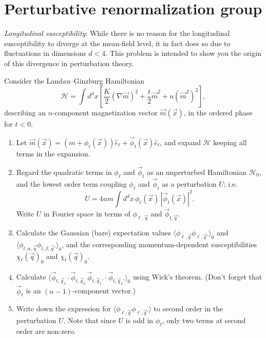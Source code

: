 \chapter{Perturbative renormalization group}

\begin{problem}
    \textit{Longitudinal susceptibility}: While there is no reason for the longitudinal susceptibility to diverge at the mean-field level, it in fact does so due to fluctuations in dimensions $d < 4$. This problem is intended to show you the origin of this divergence in perturbation theory.

    Consider the Landau--Ginzburg Hamiltonian
    \[
        \mathcal{H} = \int d^dx\left[\frac{K}{2}(\nabla\vec{m})^2 + \frac{t}{2}\vec{m}^2 + u(\vec{m}^2)^2\right],
    \]
    describing an $n$-component magnetization vector $\vec{m}(\vec{x})$, in the ordered phase for $t < 0$.

    \begin{enumerate}
        \item[(a)] Let $\vec{m}(\vec{x}) = (m + \phi_\ell(\vec{x}))\hat{e}_\ell + \vec{\phi}_t(\vec{x})\hat{e}_t$, and expand $\mathcal{H}$ keeping all terms in the expansion.

        \item[(b)] Regard the quadratic terms in $\phi_\ell$ and $\vec{\phi}_t$ as an unperturbed Hamiltonian $\mathcal{H}_0$, and the lowest order term coupling $\phi_\ell$ and $\vec{\phi}_t$ as a perturbation $U$; i.e.
        \[
            U = 4um\int d^dx\,\phi_\ell(\vec{x})\,|\vec{\phi}_t(\vec{x})|^2.
        \]
        Write $U$ in Fourier space in terms of $\phi_{\ell,\vec{q}}$ and $\vec{\phi}_{t,\vec{q}}$.

        \item[(c)] Calculate the Gaussian (bare) expectation values $\langle\phi_{\ell,\vec{q}}\phi_{\ell,\vec{q}'}\rangle_0$ and $\langle\phi_{t,\alpha,\vec{q}}\phi_{t,\beta,\vec{q}'}\rangle_0$, and the corresponding momentum-dependent susceptibilities $\chi_\ell(\vec{q})_0$ and $\chi_t(\vec{q})_0$.

        \item[(d)] Calculate $\langle\vec{\phi}_{t,\vec{q}_1}\cdot\vec{\phi}_{t,\vec{q}_2}\,\vec{\phi}_{t,\vec{q}_1'}\cdot\vec{\phi}_{t,\vec{q}_2'}\rangle_0$ using Wick's theorem. (Don't forget that $\vec{\phi}_t$ is an $(n-1)$-component vector.)

        \item[(e)] Write down the expression for $\langle\phi_{\ell,\vec{q}}\phi_{\ell,\vec{q}'}\rangle$ to second order in the perturbation $U$. Note that since $U$ is odd in $\phi_\ell$, only two terms at second order are non-zero.


\end{enumerate}
\end{problem}
